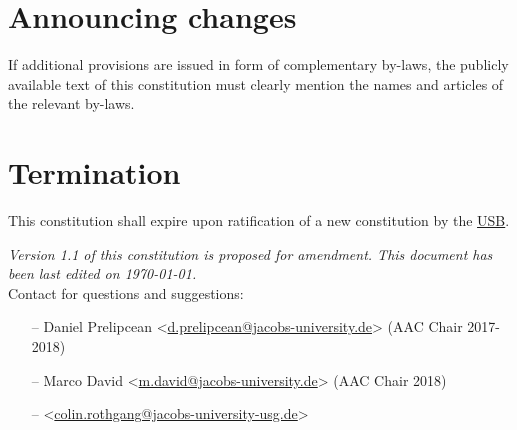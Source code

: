 \section{Announcing changes}
If additional provisions are issued in form of complementary by-laws, the publicly available text of this constitution must clearly mention the names and articles of the relevant by-laws.


\section{Termination}
This constitution shall expire upon ratification of a new constitution by the \hyperref[studentbody]{USB}.


\vfill
\nolinenumbers
\emph{Version 1.1 of this constitution is proposed for amendment. This document has been last edited on \today.}\\

Contact for questions and suggestions:
\begin{itemize}[nosep]
\item[--] Daniel Prelipcean <\url{d.prelipcean@jacobs-university.de}> (AAC Chair 2017-2018)
\item[--] Marco David <\url{m.david@jacobs-university.de}> (AAC Chair 2018)
\item[--] <\url{colin.rothgang@jacobs-university-usg.de}>
\end{itemize}